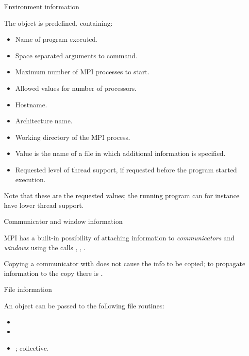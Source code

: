  {Environment information}
\label{sec:mpi-info-env}

The object  is predefined, containing:
\begin{itemize}
\item {}
  Name of program executed.
\item  {}
  Space separated arguments to command.
\item  {}
  Maximum number of MPI processes to start.
\item   {}
  Allowed values for number of processors.
\item   {}
  Hostname.
\item   {}
  Architecture name.
\item   {}
  Working directory of the MPI process.
\item   {}
  Value is the name of a file in which additional information is specified.
\item   {}
  Requested level of thread support, if requested before the program started execution.
\end{itemize}
Note that these are the requested values; the running program can for instance
have lower thread support.

 {Communicator and window information}
\label{sec:mpi-comm-info}

MPI has a built-in possibility of attaching information to
\emph{communicators}
and
\emph{windows}
using the calls
,
,
.

Copying a communicator with  does not cause
the info to be copied; to propagate information to the copy there is
.

 {File information}
\label{sec:mpi-file-info}

An  object can be passed to the following file routines:
\begin{itemize}
\item {}
\item {}
\item {}; collective.
\end{itemize}

